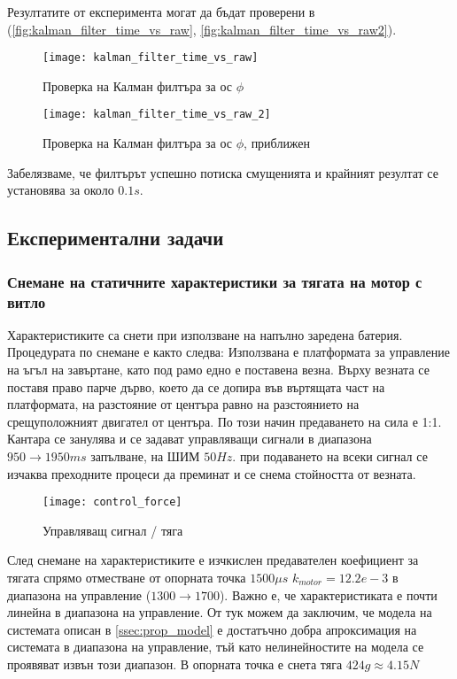 Резултатите от експеримента могат да бъдат проверени в (\autoref{fig:kalman_filter_time_vs_raw}, \autoref{fig:kalman_filter_time_vs_raw2}).

\begin{figure}[htpb!]
    \centering
    \texttt{[image: kalman\_filter\_time\_vs\_raw]}
    \caption{Проверка на Калман филтъра за ос \(\phi\)}
    \label{fig:kalman_filter_time_vs_raw}
\end{figure}

\begin{figure}[htpb!]
    \centering
    \texttt{[image: kalman\_filter\_time\_vs\_raw\_2]}
    \caption{Проверка на Калман филтъра за ос \(\phi\), приближен}
    \label{fig:kalman_filter_time_vs_raw2}
\end{figure}

Забелязваме, че филтърът успешно потиска смущенията и крайният резултат се установява за около \(0.1s\).

\FloatBarrier

\subsection{Експериментални задачи}

\subsubsection{Снемане на статичните характеристики за тягата на мотор с витло}

Характеристиките са снети при използване на напълно заредена батерия.
Процедурата по снемане е както следва:
Използвана е платформата за управление на ъгъл на завъртане,
като под рамо едно е поставена везна. Върху везната се поставя право парче дърво, което да се допира във въртящата част на платформата,
на разстояние от центъра равно на разстоянието на срещуположният двигател от центъра. 
По този начин предаването на сила е 1:1.
Кантара се занулява и се задават управляващи сигнали в диапазона \(950 \to 1950ms\) запълване,
на ШИМ \(50Hz\). при подаването на всеки сигнал се изчаква преходните процеси да преминат и се снема стойността от везната.

\begin{figure}[htpb!]
    \centering
    \texttt{[image: control\_force]}
    \caption{Управляващ сигнал / тяга}
    \label{fig:control_force}
\end{figure}

След снемане на характеристиките е изчкислен предавателен коефициент за тягата спрямо отместване от опорната точка 
\(1500\mu s\) \(k_{motor} = 12.2e-3\) в диапазона на управление (\(1300\to1700\)).
Важно е, че характеристиката е почти линейна в диапазона на управление.
От тук можем да заключим, че модела на системата описан в \autoref{ssec:prop_model} 
е достатъчно добра апроксимация на системата в диапазона на управление, тъй като нелинейностите на
модела се проявяват извън този диапазон.
В опорната точка е снета тяга \(424g \approx 4.15N\)

